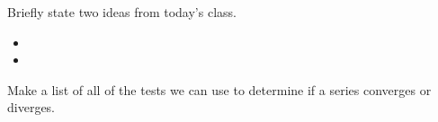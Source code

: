 \postClass

\begin{problem}
\item Briefly state two ideas from today's class.
  \begin{itemize}
  \item
  \item
  \end{itemize}
\item
  \begin{subproblem}
    \item
  \end{subproblem}
\end{problem}

\begin{problem}
    \item Make a list of all of the tests we can use to determine if a series converges or diverges.
\end{problem}

